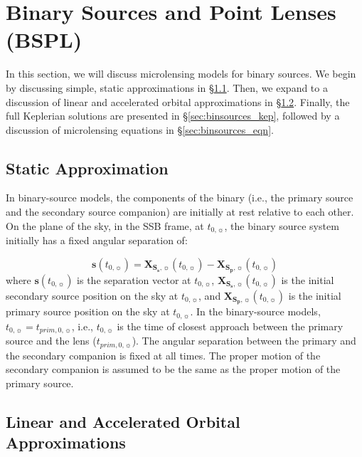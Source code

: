 \documentclass[twocolumn]{aastex701}
\newcommand{\vect}[1]{\boldsymbol{#1}}
\newcommand{\tnot}{t_{0,\sun}}
\newcommand{\Xspvec}{\vect{X}_{\boldsymbol{S_p},\sun}}
\newcommand{\Xssvec}{\vect{X}_{\boldsymbol{S_s},\sun}}
\newcommand{\tpnot}{t_{prim,0,\sun}}
\begin{document}


\section{Binary Sources and Point Lenses (BSPL) \label{sec:binsource}}

In this section, we will discuss microlensing models for binary sources. We begin by discussing simple, static approximations in \S\ref{sec:binsources_static}. Then, we expand to a discussion of linear and accelerated orbital approximations in \S\ref{sec:binsources_lin}. Finally, the full Keplerian solutions are presented in \S\ref{sec:binsources_kep}, followed by a discussion of microlensing equations in \S\ref{sec:binsources_eqn}.

\subsection{Static Approximation}
\label{sec:binsources_static}

In binary-source models, the components of the binary (i.e., the primary source and the secondary source companion) are initially at rest relative to each other. On the plane of the sky, in the SSB frame, at $\tnot$, the binary source system initially has a fixed angular separation of:

\begin{equation}
    \vect{s}(\tnot) = \Xssvec(\tnot) - \Xspvec(\tnot)
\end{equation}
%
where $\vect{s}(\tnot)$ is the separation vector at $\tnot$, $\Xssvec(\tnot)$ is the initial secondary source position on the sky at $\tnot$, and $\Xspvec (\tnot)$ is the initial primary source position on the sky at $\tnot$. In the binary-source models, $\tnot = \tpnot$, i.e., $\tnot$ is the time of closest approach between the primary source and the lens ($\tpnot$). The angular separation between the primary and the secondary companion is fixed at all times. The proper motion of the secondary companion is assumed to be the same as the proper motion of the primary source. 

\subsection{Linear and Accelerated Orbital Approximations}
\label{sec:binsources_lin}
\end{document}

